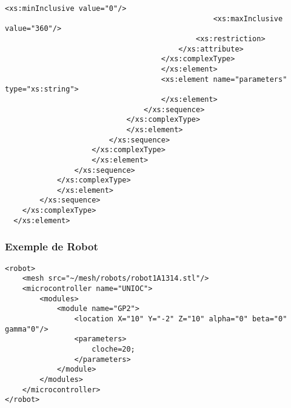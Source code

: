 \begin{changemargin}{-1cm}{-1cm}
\begin{lstlisting}[caption=Description du Robot, label=descbot]
                                                <xs:minInclusive value="0"/>
                                                <xs:maxInclusive value="360"/>
                                            <xs:restriction>
                                        </xs:attribute>
                                    </xs:complexType>
                                    </xs:element>
                                    <xs:element name="parameters" type="xs:string">
                                    </xs:element>
                                </xs:sequence>
                            </xs:complexType>
                            </xs:element>
                        </xs:sequence>
                    </xs:complexType>
                    </xs:element>
                </xs:sequence>
            </xs:complexType>
            </xs:element>
        </xs:sequence>
    </xs:complexType>
  </xs:element>
  \end{lstlisting}
\end{changemargin}

\subsubsection{Exemple de Robot}
\begin{lstlisting}[caption=Exemple de Robot, label=exrobot]
<robot>
	<mesh src="~/mesh/robots/robot1A1314.stl"/>
	<microcontroller name="UNIOC">
		<modules>
			<module name="GP2">
				<location X="10" Y="-2" Z="10" alpha="0" beta="0" gamma"0"/>
				<parameters>
					cloche=20;
				</parameters>
			</module>
		</modules>
	</microcontroller>
</robot>
\end{lstlisting}
  
\clearpage
